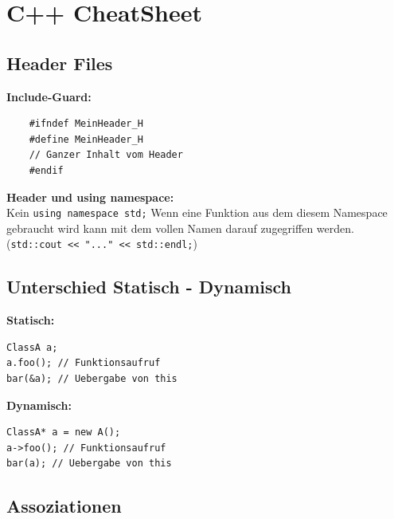 \section{C++ CheatSheet}

\subsection{Header Files}
\begin{multicols}{2}
	\textbf{Include-Guard:}
	\begin{lstlisting}
	#ifndef MeinHeader_H
	#define MeinHeader_H
	// Ganzer Inhalt vom Header
	#endif
	\end{lstlisting}
	
	\textbf{Header und using namespace:} \\
	Kein \lstinline!using namespace std;! Wenn eine Funktion aus
	dem diesem Namespace gebraucht wird kann mit dem vollen Namen darauf
	zugegriffen werden. (\lstinline!std::cout << "..." << std::endl;!)
\end{multicols}


\subsection{Unterschied Statisch - Dynamisch}
\begin{multicols}{2}
\textbf{Statisch:}
\begin{lstlisting}
ClassA a;
a.foo(); // Funktionsaufruf
bar(&a); // Uebergabe von this
\end{lstlisting}

\textbf{Dynamisch:} 
\begin{lstlisting}
ClassA* a = new A();
a->foo(); // Funktionsaufruf
bar(a); // Uebergabe von this
\end{lstlisting}
\end{multicols}

\subsection{Assoziationen}
